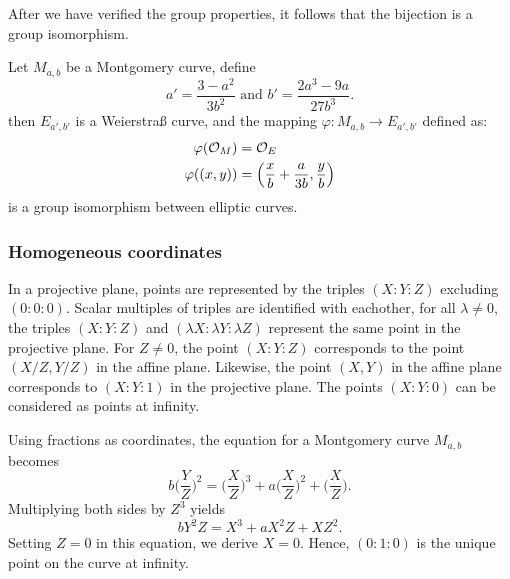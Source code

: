 After we have verified the group properties, it follows that the bijection is a group isomorphism.
\begin{lemma}
  \label{lemma:bij-ecc}
  Let $M_{a,b}$ be a Montgomery curve, define
  $$a' = \frac{3-a^2}{3b^2} \text{\ \ \ \ and\ \ \ \ } b' = \frac{2a^3 - 9a}{27b^3}.$$
    then $E_{a',b'}$ is a Weierstra{\ss} curve, and the mapping
  $\varphi : M_{a,b} \to E_{a',b'}$ defined as:
  \begin{align*}
    \varphi(\mathcal{O}_M)   & = \mathcal{O}_E                                                 \\
    \varphi( (x , y) ) & = \left( \frac{x}{b} + \frac{a}{3b} , \frac{y}{b} \right)
  \end{align*}
  is a group isomorphism between elliptic curves.
\end{lemma}



\subsubsection{Homogeneous coordinates}
\label{subsec:ECC-projective}

In a projective plane, points are represented by the triples $(X:Y:Z)$ excluding $(0:0:0)$.
Scalar multiples of triples are identified with eachother, \ie
for all $\lambda \neq 0$, the triples $(X:Y:Z)$ and $(\lambda X:\lambda Y:\lambda Z)$ represent
the same point in the projective plane.
For $Z\neq 0$, the point $(X:Y:Z)$ corresponds to the
point $(X/Z,Y/Z)$ in the affine plane.
Likewise, the point $(X,Y)$ in the affine plane corresponds to $(X:Y:1)$ in the projective plane.
The points $(X : Y : 0)$ can be considered as points at infinity.

Using fractions as coordinates, the equation for a Montgomery curve $M_{a,b}$
becomes
$$b \bigg(\frac{Y}{Z}\bigg)^2 = \bigg(\frac{X}{Z}\bigg)^3 + a \bigg(\frac{X}{Z}\bigg)^2 + \bigg(\frac{X}{Z}\bigg).$$
Multiplying both sides by $Z^3$ yields
$$b Y^2Z = X^3 + a X^2Z + XZ^2.$$
Setting $Z = 0$ in this equation, we derive $X = 0$.
Hence, $(0 : 1 : 0)$ is the unique point on the curve at infinity.

